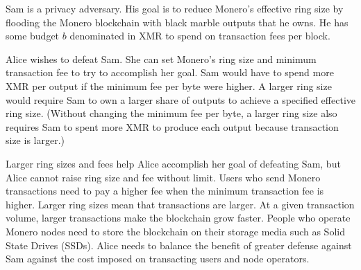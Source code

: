 \documentclass[english]{article}
\begin{document}
Sam is a privacy adversary. His goal is to reduce Monero's effective
ring size by flooding the Monero blockchain with black marble outputs
that he owns. He has some budget $b$ denominated in XMR to spend
on transaction fees per block.

Alice wishes to defeat Sam. She can set Monero's ring size and minimum
transaction fee to try to accomplish her goal. Sam would have to spend
more XMR per output if the minimum fee per byte were higher. A larger
ring size would require Sam to own a larger share of outputs to achieve
a specified effective ring size. (Without changing the minimum fee
per byte, a larger ring size also requires Sam to spent more XMR to
produce each output because transaction size is larger.)

Larger ring sizes and fees help Alice accomplish her goal of defeating
Sam, but Alice cannot raise ring size and fee without limit. Users
who send Monero transactions need to pay a higher fee when the minimum
transaction fee is higher. Larger ring sizes mean that transactions
are larger. At a given transaction volume, larger transactions make
the blockchain grow faster. People who operate Monero nodes need to
store the blockchain on their storage media such as Solid State Drives
(SSDs). Alice needs to balance the benefit of greater defense against
Sam against the cost imposed on transacting users and node operators.
\end{document}
